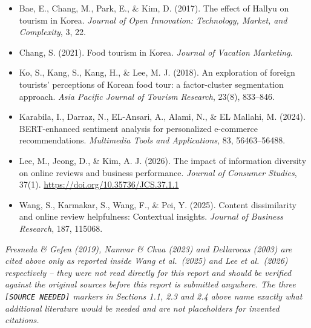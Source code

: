 \documentclass[10pt,a4paper]{article}
\newcommand{\subsect}[1]{\vspace{6pt}\noindent{\large\bfseries #1}\par\vspace{2pt}}
\begin{document}
\vspace{8pt}
\subsect{References}
\begin{itemize}[leftmargin=14pt, itemsep=3pt]
  \item Bae, E., Chang, M., Park, E., \& Kim, D. (2017). The effect of Hallyu
        on tourism in Korea. \textit{Journal of Open Innovation: Technology,
        Market, and Complexity}, 3, 22.
  \item Chang, S. (2021). Food tourism in Korea. \textit{Journal of Vacation
        Marketing}.
  \item Ko, S., Kang, S., Kang, H., \& Lee, M. J. (2018). An exploration of
        foreign tourists' perceptions of Korean food tour: a factor-cluster
        segmentation approach. \textit{Asia Pacific Journal of Tourism
        Research}, 23(8), 833--846.
  \item Karabila, I., Darraz, N., EL-Ansari, A., Alami, N., \& EL Mallahi, M.
        (2024). BERT-enhanced sentiment analysis for personalized e-commerce
        recommendations. \textit{Multimedia Tools and Applications}, 83,
        56463--56488.
  \item Lee, M., Jeong, D., \& Kim, A. J. (2026). The impact of information
        diversity on online reviews and business performance.
        \textit{Journal of Consumer Studies}, 37(1).
        \url{https://doi.org/10.35736/JCS.37.1.1}
  \item Wang, S., Karmakar, S., Wang, F., \& Pei, Y. (2025). Content
        dissimilarity and online review helpfulness: Contextual insights.
        \textit{Journal of Business Research}, 187, 115068.
\end{itemize}

\vspace{4pt}
{\footnotesize\textit{Fresneda \& Gefen (2019), Namvar \& Chua (2023) and
Dellarocas (2003) are cited above only as reported inside Wang et al.\
(2025) and Lee et al.\ (2026) respectively -- they were not read directly for
this report and should be verified against the original sources before this
report is submitted anywhere. The three \texttt{[SOURCE NEEDED]} markers in
Sections 1.1, 2.3 and 2.4 above name exactly what additional literature
would be needed and are not placeholders for invented citations.}}

\clearpage
\setcounter{table}{0}

\end{document}
